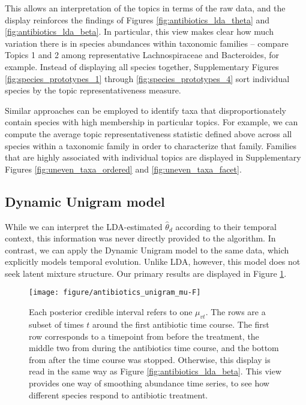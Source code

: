 \documentclass[oupdraft]{bio}
\begin{document}
This allows an interpretation of the topics in terms of the raw data, and the
display reinforces the findings of Figures \ref{fig:antibiotics_lda_theta} and
\ref{fig:antibiotics_lda_beta}. In particular, this view makes clear how much
variation there is in species abundances within taxonomic families -- compare
Topics 1 and 2 among representative Lachnospiraceae and Bacteroides, for
example. Instead of displaying all species together, Supplementary Figures
\ref{fig:species_prototypes_1} through \ref{fig:species_prototypes_4} sort
individual species by the topic representativeness measure.

Similar approaches can be employed to identify taxa that disproportionately
contain species with high membership in particular topics. For example, we can
compute the average topic representativeness statistic defined above across all
species within a taxonomic family in order to characterize that family. Families
that are highly associated with individual topics are displayed in Supplementary
Figures \ref{fig:uneven_taxa_ordered} and \ref{fig:uneven_taxa_facet}.

\subsection{Dynamic Unigram model}
\label{sec:antibiotics_unigram}

While we can interpret the LDA-estimated $\hat{\theta}_{d}$ according to their
temporal context, this information was never directly provided to the algorithm.
In contrast, we can apply the Dynamic Unigram model to the same data, which
explicitly models temporal evolution. Unlike LDA, however, this model does not
seek latent mixture structure. Our primary results are displayed in Figure
\ref{fig:antibiotics_unigram_theta}.

\begin{figure}[!p]
  \centering
  \texttt{[image: figure/antibiotics\_unigram\_mu-F]}
  \caption{Each posterior credible interval refers to one $\mu_{vt}$. The rows
    are a subset of times $t$ around the first antibiotic time course. The first
    row corresponds to a timepoint from before the treatment, the middle two
    from during the antibiotics time course, and the bottom from after the time
    course was stopped. Otherwise, this display is read in the same way as
    Figure \ref{fig:antibiotics_lda_beta}. This view provides one way of
    smoothing abundance time series, to see how different species respond to
    antibiotic treatment. \label{fig:antibiotics_unigram_theta} }
\end{figure}
\end{document}
